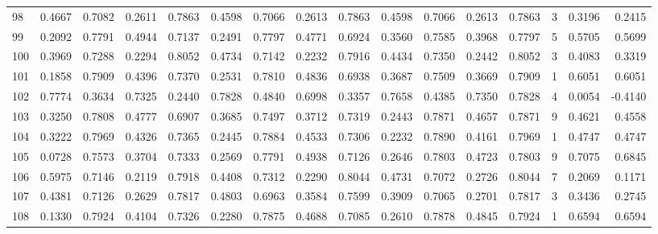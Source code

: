 \begin{tabular}{lrrrrrrrrrrrrrrr}
98  &      0.4667 &  0.7082 &  0.2611 &  0.7863 &  0.4598 &  0.7066 &  0.2613 &  0.7863 &  0.4598 &  0.7066 &   0.2613 &     0.7863 &      3 &                    0.3196 &                     0.2415 \\
99  &      0.2092 &  0.7791 &  0.4944 &  0.7137 &  0.2491 &  0.7797 &  0.4771 &  0.6924 &  0.3560 &  0.7585 &   0.3968 &     0.7797 &      5 &                    0.5705 &                     0.5699 \\
100 &      0.3969 &  0.7288 &  0.2294 &  0.8052 &  0.4734 &  0.7142 &  0.2232 &  0.7916 &  0.4434 &  0.7350 &   0.2442 &     0.8052 &      3 &                    0.4083 &                     0.3319 \\
101 &      0.1858 &  0.7909 &  0.4396 &  0.7370 &  0.2531 &  0.7810 &  0.4836 &  0.6938 &  0.3687 &  0.7509 &   0.3669 &     0.7909 &      1 &                    0.6051 &                     0.6051 \\
102 &      0.7774 &  0.3634 &  0.7325 &  0.2440 &  0.7828 &  0.4840 &  0.6998 &  0.3357 &  0.7658 &  0.4385 &   0.7350 &     0.7828 &      4 &                    0.0054 &                    -0.4140 \\
103 &      0.3250 &  0.7808 &  0.4777 &  0.6907 &  0.3685 &  0.7497 &  0.3712 &  0.7319 &  0.2443 &  0.7871 &   0.4657 &     0.7871 &      9 &                    0.4621 &                     0.4558 \\
104 &      0.3222 &  0.7969 &  0.4326 &  0.7365 &  0.2445 &  0.7884 &  0.4533 &  0.7306 &  0.2232 &  0.7890 &   0.4161 &     0.7969 &      1 &                    0.4747 &                     0.4747 \\
105 &      0.0728 &  0.7573 &  0.3704 &  0.7333 &  0.2569 &  0.7791 &  0.4938 &  0.7126 &  0.2646 &  0.7803 &   0.4723 &     0.7803 &      9 &                    0.7075 &                     0.6845 \\
106 &      0.5975 &  0.7146 &  0.2119 &  0.7918 &  0.4408 &  0.7312 &  0.2290 &  0.8044 &  0.4731 &  0.7072 &   0.2726 &     0.8044 &      7 &                    0.2069 &                     0.1171 \\
107 &      0.4381 &  0.7126 &  0.2629 &  0.7817 &  0.4803 &  0.6963 &  0.3584 &  0.7599 &  0.3909 &  0.7065 &   0.2701 &     0.7817 &      3 &                    0.3436 &                     0.2745 \\
108 &      0.1330 &  0.7924 &  0.4104 &  0.7326 &  0.2280 &  0.7875 &  0.4688 &  0.7085 &  0.2610 &  0.7878 &   0.4845 &     0.7924 &      1 &                    0.6594 &                     0.6594 \\

\end{tabular}
